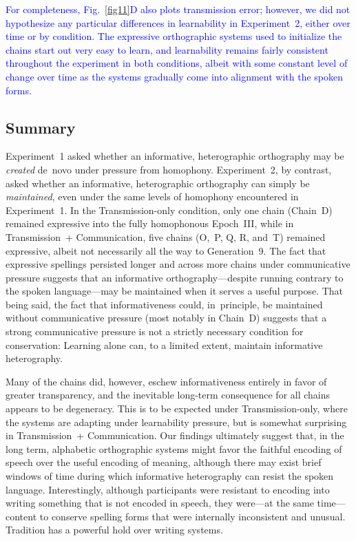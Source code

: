 \documentclass[doc,biblatex]{apa7}
\newcommand\newmaterial[1]{\textcolor{blue}{#1}}
\begin{document}
\newmaterial{For completeness, Fig.~\ref{fig11}D also plots transmission error; however, we did not hypothesize any particular differences in learnability in Experiment~2, either over time or by condition. The expressive orthographic systems used to initialize the chains start out very easy to learn, and learnability remains fairly consistent throughout the experiment in both conditions, albeit with some constant level of change over time as the systems gradually come into alignment with the spoken forms.}

\subsection{Summary}

Experiment~1 asked whether an informative, heterographic orthography may be \textit{created} de~novo under pressure from homophony. Experiment~2, by contrast, asked whether an informative, heterographic orthography can simply be \textit{maintained}, even under the same levels of homophony encountered in Experiment~1. In the Transmission-only condition, only one chain (Chain~D) remained expressive into the fully homophonous Epoch~III, while in Transmission~+ Communication, five chains (O,~P, Q, R, and~T) remained expressive, albeit not necessarily all the way to Generation~9. The fact that expressive spellings persisted longer and across more chains under communicative pressure suggests that an informative orthography---despite running contrary to the spoken language---may be maintained when it serves a useful purpose. That being said, the fact that informativeness could, in~principle, be maintained without communicative pressure (most notably in Chain~D) suggests that a strong communicative pressure is not a strictly necessary condition for conservation: Learning alone can, to a limited extent, maintain informative heterography.

Many of the chains did, however, eschew informativeness entirely in favor of greater transparency, and the inevitable long-term consequence for all chains appears to be degeneracy. This is to be expected under Transmission-only, where the systems are adapting under learnability pressure, but is somewhat surprising in Transmission~+ Communication. Our findings ultimately suggest that, in the long term, alphabetic orthographic systems might favor the faithful encoding of speech over the useful encoding of meaning, although there may exist brief windows of time during which informative heterography can resist the spoken language. Interestingly, although participants were resistant to encoding into writing something that is not encoded in speech, they were---at the same time---content to conserve spelling forms that were internally inconsistent and unusual. Tradition has a powerful hold over writing systems.
\end{document}
